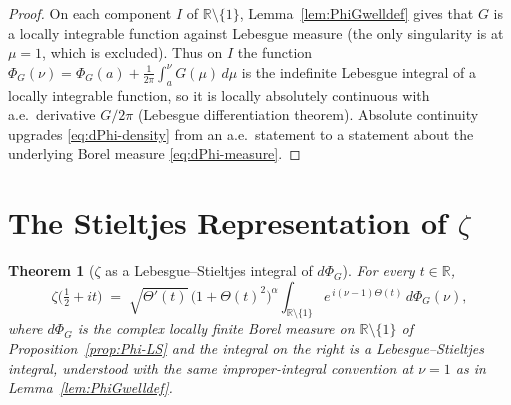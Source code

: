 \documentclass[11pt]{article}
\newtheorem{theorem}{Theorem}
\begin{document}
\begin{proof}
On each component $I$ of $\mathbb R\setminus\{1\}$, Lemma~\ref{lem:PhiGwelldef} gives that $G$ is a locally integrable function against Lebesgue measure (the only singularity is at $\mu=1$, which is excluded). Thus on $I$ the function $\Phi_G(\nu)=\Phi_G(a)+\frac{1}{2\pi}\int_a^\nu G(\mu)\,d\mu$ is the indefinite Lebesgue integral of a locally integrable function, so it is locally absolutely continuous with a.e.\ derivative $G/2\pi$ (Lebesgue differentiation theorem). Absolute continuity upgrades \eqref{eq:dPhi-density} from an a.e.\ statement to a statement about the underlying Borel measure \eqref{eq:dPhi-measure}.
\end{proof}

\section{The Stieltjes Representation of $\zeta$}

\begin{theorem}[$\zeta$ as a Lebesgue--Stieltjes integral of $d\Phi_G$]\label{thm:zeta-LS}
For every $t\in\mathbb R$,
\begin{equation}\label{eq:zeta-LS}
\zeta\!\bigl(\tfrac12+it\bigr)
\;=\;
\sqrt{\Theta'(t)}\,\bigl(1+\Theta(t)^2\bigr)^{\alpha}\!
\int_{\mathbb R\setminus\{1\}} e^{\,i(\nu-1)\Theta(t)}\,d\Phi_G(\nu),
\end{equation}
where $d\Phi_G$ is the complex locally finite Borel measure on $\mathbb R\setminus\{1\}$ of Proposition~\ref{prop:Phi-LS} and the integral on the right is a Lebesgue--Stieltjes integral, understood with the same improper-integral convention at $\nu=1$ as in Lemma~\ref{lem:PhiGwelldef}.
\end{theorem}
\end{document}
